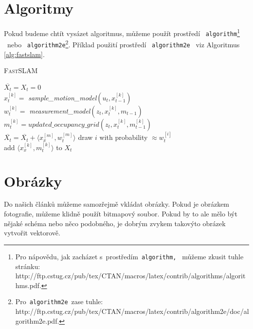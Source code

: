 \documentclass[11pt,a4paper]{article}
\begin{document}
\section{Algoritmy} \label{sec:Algoritmy}
Pokud budeme chtít vysázet algoritmus, můžeme použít prostředí \ \texttt{algorithm}\footnote{Pro nápovědu, jak zacházet s~prostředím\ \texttt{algorithm,} \ můžeme zkusit tuhle stránku:\\ http://ftp.cstug.cz/pub/tex/CTAN/macros/latex/contrib/algorithms/algorithms.pdf.}
\ nebo \ \texttt{algorithm2e}\footnote{Pro\ \texttt{algorithm2e}\ zase tuhle: http://ftp.cstug.cz/pub/tex/CTAN/macros/latex/contrib/algorithm2e/doc/algorithm2e.pdf.\vspace*{\fill}\pagebreak }.
Příklad použití prostředí \ \texttt{algorithm2e} \ viz Algoritmus \ref{alg:fastslam}.
\bigskip	

\bigskip

\begin{algorithm}[H]
\caption{\textsc{Fast}SLAM}
\label{alg:fastslam}
\SetNlSty{}{}{:  } 
\SetInd{0.5em}{0.5em}
\SetNlSkip{-1.5em}

\BlankLine
\Indp \Indp
    $\overline{X_t} = X_t = 0$\\
    { 
    \quad $x_t^{[k]} =$ \emph{sample\_motion\_model}$(u_t,x_{t-1}^{[k]})$\\
    \quad $w_t^{[k]} =$ \emph{measurement\_model}$(z_t,x_t^{[k]},m_{t-1})$\\
    \quad $m_t^{[k]} = updated\_occupancy\_grid(z_t,x_t^{[k]},m_{t-1}^{[k]})$\\
    \quad $\overline{X_t} = \overline{X_t} + \langle x_x^{[m]},w_t^{[m]}\rangle$
    }
    {
    \quad draw $i$ with probability $\approx w_t^{[i]}$\\
    \quad add $\langle x_x^{[k]},m_t^{[k]}\rangle$ to $X_t$\\
    }
\end{algorithm}
\medskip
\section{Obrázky}
Do našich článků můžeme samozřejmě vkládat obrázky. Pokud je obrázkem fotografie,
můžeme klidně použít bitmapový soubor. Pokud by to ale mělo být nějaké schéma nebo
něco podobného, je dobrým zvykem takovýto obrázek vytvořit vektorově.
\end{document}
